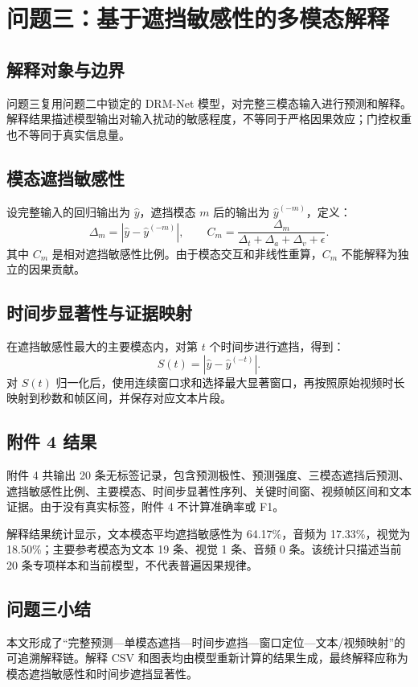\section{问题三：基于遮挡敏感性的多模态解释}

\subsection{解释对象与边界}
问题三复用问题二中锁定的 DRM-Net 模型，对完整三模态输入进行预测和解释。解释结果描述模型输出对输入扰动的敏感程度，不等同于严格因果效应；门控权重也不等同于真实信息量。

\subsection{模态遮挡敏感性}
设完整输入的回归输出为 $\widehat y$，遮挡模态 $m$ 后的输出为 $\widehat y^{(-m)}$，定义：
\begin{equation}
\Delta_m=|\widehat y-\widehat y^{(-m)}|,
\qquad C_m=\frac{\Delta_m}{\Delta_t+\Delta_a+\Delta_v+\epsilon}.
\end{equation}
其中 $C_m$ 是相对遮挡敏感性比例。由于模态交互和非线性重算，$C_m$ 不能解释为独立的因果贡献。

\subsection{时间步显著性与证据映射}
在遮挡敏感性最大的主要模态内，对第 $t$ 个时间步进行遮挡，得到：
\begin{equation}
S(t)=|\widehat y-\widehat y^{(-t)}|.
\end{equation}
对 $S(t)$ 归一化后，使用连续窗口求和选择最大显著窗口，再按照原始视频时长映射到秒数和帧区间，并保存对应文本片段。

\subsection{附件 4 结果}
附件 4 共输出 20 条无标签记录，包含预测极性、预测强度、三模态遮挡后预测、遮挡敏感性比例、主要模态、时间步显著性序列、关键时间窗、视频帧区间和文本证据。由于没有真实标签，附件 4 不计算准确率或 F1。

解释结果统计显示，文本模态平均遮挡敏感性为 64.17\%，音频为 17.33\%，视觉为 18.50\%；主要参考模态为文本 19 条、视觉 1 条、音频 0 条。该统计只描述当前 20 条专项样本和当前模型，不代表普遍因果规律。

\subsection{问题三小结}
本文形成了“完整预测—单模态遮挡—时间步遮挡—窗口定位—文本/视频映射”的可追溯解释链。解释 CSV 和图表均由模型重新计算的结果生成，最终解释应称为模态遮挡敏感性和时间步遮挡显著性。

